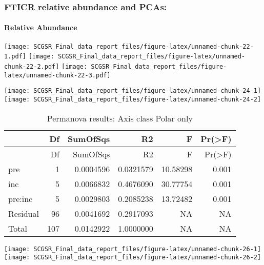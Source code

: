 \documentclass[
]{article}
\begin{document}
\hypertarget{fticr-relative-abundance-and-pcas}{%
\subsubsection{FTICR relative abundance and
PCAs:}\label{fticr-relative-abundance-and-pcas}}

\hypertarget{relative-abundance}{%
\paragraph{Relative Abundance}\label{relative-abundance}}

\texttt{[image: SCGSR\_Final\_data\_report\_files/figure-latex/unnamed-chunk-22-1.pdf]}
\texttt{[image: SCGSR\_Final\_data\_report\_files/figure-latex/unnamed-chunk-22-2.pdf]}
\texttt{[image: SCGSR\_Final\_data\_report\_files/figure-latex/unnamed-chunk-22-3.pdf]}

\texttt{[image: SCGSR\_Final\_data\_report\_files/figure-latex/unnamed-chunk-24-1]}
\texttt{[image: SCGSR\_Final\_data\_report\_files/figure-latex/unnamed-chunk-24-2]}

\begin{longtable}[]{@{}lrrrrr@{}}
\caption{Permanova results: Axis class Polar only}\tabularnewline
\toprule\noalign{}
& Df & SumOfSqs & R2 & F & Pr(\textgreater F) \\
\midrule\noalign{}
\endfirsthead
\toprule\noalign{}
& Df & SumOfSqs & R2 & F & Pr(\textgreater F) \\
\midrule\noalign{}
\endhead
\bottomrule\noalign{}
\endlastfoot
pre & 1 & 0.0004596 & 0.0321579 & 10.58298 & 0.001 \\
inc & 5 & 0.0066832 & 0.4676090 & 30.77754 & 0.001 \\
pre:inc & 5 & 0.0029803 & 0.2085238 & 13.72482 & 0.001 \\
Residual & 96 & 0.0041692 & 0.2917093 & NA & NA \\
Total & 107 & 0.0142922 & 1.0000000 & NA & NA \\
\end{longtable}

\texttt{[image: SCGSR\_Final\_data\_report\_files/figure-latex/unnamed-chunk-26-1]}
\texttt{[image: SCGSR\_Final\_data\_report\_files/figure-latex/unnamed-chunk-26-2]}
\end{document}
